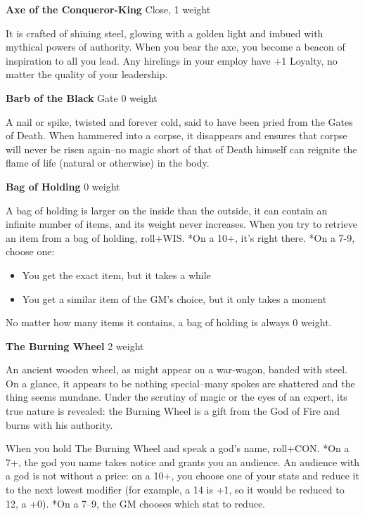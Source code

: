 {\noindent \bfseries Axe of the Conqueror-King} \hspace*{\fill} Close, 1 weight

It is crafted of shining steel, glowing with a golden light and imbued with mythical powers of authority. When you bear the axe, you become a beacon of inspiration to all you lead. Any hirelings in your employ have +1 Loyalty, no matter the quality of your leadership.

{\noindent \bfseries Barb of the Black} \hspace*{\fill} Gate 0 weight

A nail or spike, twisted and forever cold, said to have been pried from the Gates of Death. When hammered into a corpse, it disappears and ensures that corpse will never be risen again--no magic short of that of Death himself can reignite the flame of life (natural or otherwise) in the body.

{\noindent \bfseries Bag of Holding} \hspace*{\fill} 0 weight

A bag of holding is larger on the inside than the outside, it can contain an infinite number of items, and its weight never increases. When you try to retrieve an item from a bag of holding, roll+WIS. *On a 10+, it's right there. *On a 7-9, choose one:
\begin{itemize}
\item You get the exact item, but it takes a while
\item You get a similar item of the GM's choice, but it only takes a moment

\end{itemize}

No matter how many items it contains, a bag of holding is always 0 weight.

{\noindent \bfseries The Burning Wheel} \hspace*{\fill} 2 weight

An ancient wooden wheel, as might appear on a war-wagon, banded with steel. On a glance, it appears to be nothing special--many spokes are shattered and the thing seems mundane. Under the scrutiny of magic or the eyes of an expert, its true nature is revealed: the Burning Wheel is a gift from the God of Fire and burns with his authority.

When you hold The Burning Wheel and speak a god's name, roll+CON. *On a 7+, the god you name takes notice and grants you an audience. An audience with a god is not without a price: on a 10+, you choose one of your stats and reduce it to the next lowest modifier (for example, a 14 is +1, so it would be reduced to 12, a +0). *On a 7--9, the GM chooses which stat to reduce.

